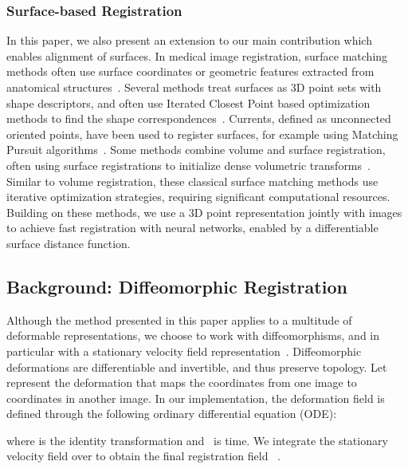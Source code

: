 \documentclass{article}
\newcommand{\citep}{\cite}
\begin{document}
{\color{blue}
\subsubsection{\color{blue}Surface-based Registration}
	In this paper, we also present an extension to our main contribution which enables alignment of surfaces. In medical image registration, surface matching methods often use surface coordinates or geometric features extracted from anatomical structures~\citep{aiger2008,durrleman2010,miga2003,postelnicu2008}. Several methods treat surfaces as 3D point sets with shape descriptors, and often use Iterated Closest Point based optimization methods to find the shape correspondences~\citep{besl1992method}. Currents, defined as unconnected oriented points, have been used to register surfaces, for example using Matching Pursuit algorithms~\cite{durrleman2010}. Some methods combine volume and surface registration, often using surface registrations to initialize dense volumetric transforms~\cite{postelnicu2008}. Similar to volume registration, these classical surface matching methods use iterative optimization strategies, requiring significant computational resources. Building on these methods, we use a 3D point representation jointly with images to achieve fast registration with neural networks, enabled by a differentiable surface distance function.}





\subsection{Background: Diffeomorphic Registration}

Although the method presented in this paper applies to a multitude of deformable representations, we choose to work with diffeomorphisms, and in particular with a stationary velocity field representation~\citep{ashburner2007}.  Diffeomorphic deformations are differentiable and invertible, and thus preserve topology. Let~\mbox{} represent the deformation that maps the coordinates from one image to coordinates in another image. In our implementation,  the deformation field is defined through the following ordinary differential equation (ODE): 

where  is the identity transformation and~ is time. We integrate  the stationary velocity field  over  to obtain the final registration field ~\citep{moler2003}. 
\end{document}
